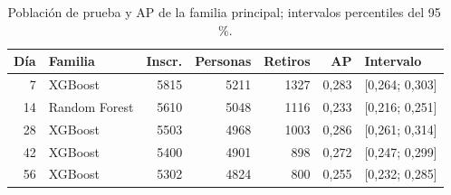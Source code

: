 \begin{table}[!htbp]\centering
\caption{Población de prueba y AP de la familia principal; intervalos percentiles del 95\,\%.}\label{res:principales}
\begin{tabular}{rlrrrrl}
\toprule
Día & Familia & Inscr. & Personas & Retiros & AP & Intervalo\\
\midrule
7 & XGBoost & 5815 & 5211 & 1327 & 0,283 & [0,264; 0,303]\\
14 & Random Forest & 5610 & 5048 & 1116 & 0,233 & [0,216; 0,251]\\
28 & XGBoost & 5503 & 4968 & 1003 & 0,286 & [0,261; 0,314]\\
42 & XGBoost & 5400 & 4901 & 898 & 0,272 & [0,247; 0,299]\\
56 & XGBoost & 5302 & 4824 & 800 & 0,255 & [0,232; 0,285]\\
\bottomrule
\end{tabular}
\end{table}
